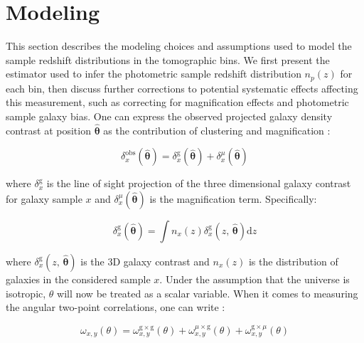 \section{Modeling}
\label{sec:modeling}


This section describes the modeling choices and assumptions used to model the sample redshift distributions in the tomographic bins. We first present the estimator used to infer the photometric sample redshift distribution $n_p(z)$ for each bin, then discuss further corrections to potential systematic effects affecting this measurement, such as correcting for magnification effects and photometric sample galaxy bias. One can express the observed projected galaxy density contrast at position $\bm{\hat{\theta}}$ as the contribution of clustering and magnification \cite{DES2021Krause, EuclidClusterRedshifts2025}:

\begin{equation}
    \delta_{x}^{\mathrm{obs}}(\bm{\hat{\theta}})=\delta_{x}^{\mathrm{g}}(\bm{\hat{\theta}})+
    \delta_{x}^{\mu}(\bm{\hat{\theta}})
\end{equation}

where $\delta_{x}^{\mathrm{g}}$ is the line of sight projection of the three dimensional galaxy contrast for galaxy sample $x$ and $\delta_{x}^{\mu}(\bm{\hat{\theta}})$ is the magnification term. Specifically:

\begin{equation}
    \delta_{x}^{\mathrm{g}}(\bm{\hat{\theta}})=\int n_x(z)\delta_{x}^{\mathrm{g}}(z,\,\bm{\hat{\theta}})\mathrm{d}z
\end{equation}

where $\delta_{x}^{\mathrm{g}}(z,\,\bm{\hat{\theta}})$ is the 3D galaxy contrast and $n_x(z)$ is the distribution of galaxies in the considered sample $x$. Under the assumption that the universe is isotropic, $\theta$ will now be treated as a scalar variable. When it comes to measuring the angular two-point correlations, one can write \cite{EuclidClusterRedshifts2025}:

\begin{equation}
    \omega_{x,y}(\theta)=\omega^{\mathrm{g} \times \mathrm{g}}_{x,y}(\theta)
    +\omega^{\mu \times \mathrm{g}}_{x,y}(\theta)+\omega^{\mathrm{g} \times \mu}_{x,y}(\theta)
\end{equation}

